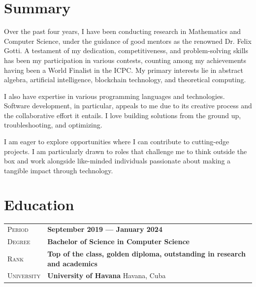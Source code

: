 \documentclass[12pt]{amsart}
\theoremstyle{definition}
\numberwithin{equation}{section}
\newcommand{\gray}{\rowcolor[gray]{.90}} %
\begin{document}
	
\section{Summary}
Over the past four years, I have been conducting research in Mathematics and Computer Science, under the guidance of good mentors as the renowned Dr. Felix Gotti. A testament of my dedication, competitiveness, and problem-solving skills has been my participation in various contests, counting among my achievements having been a World Finalist in the ICPC. My primary interests lie in abstract algebra, artificial intelligence, blockchain technology, and theoretical computing. 

I also have expertise in various programming languages and technologies. Software development, in particular, appeals to me due to its creative process and the collaborative effort it entails. I love building solutions from the ground up, troubleshooting, and optimizing.

I am eager to explore opportunities where I can contribute to cutting-edge projects. I am particularly drawn to roles that challenge me to think outside the box and work alongside like-minded individuals passionate about making a tangible impact through technology.
 


	
	
\section{Education}

	\begin{tabularx}{0.97\linewidth}{>{\raggedleft\scshape}p{2cm}X}
	\gray Period & \textbf{September 2019 --- January 2024}\\
	\gray Degree & \textbf{Bachelor of Science in Computer Science}\\
	\gray Rank & \textbf{Top of the class, golden diploma, outstanding  in research and academics}\\
	\gray University & \textbf{University of Havana} \hfill Havana, Cuba\\
	\end{tabularx}
	
\end{document}
